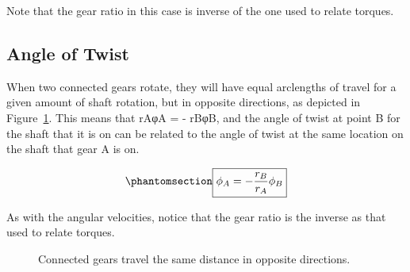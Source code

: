 \documentclass[
  letterpaper,
  DIV=11,
  numbers=noendperiod]{scrreprt}
\theoremstyle{definition}
\theoremstyle{remark}
\begin{document}
Note that the gear ratio in this case is inverse of the one used to
relate torques.

\subsection{Angle of Twist}\label{angle-of-twist}

When two connected gears rotate, they will have equal arclengths of
travel for a given amount of shaft rotation, but in opposite directions,
as depicted in Figure~\ref{fig-6.16}. This means that rAφA = - rBφB, and
the angle of twist at point B for the shaft that it is on can be related
to the angle of twist at the same location on the shaft that gear A is
on.

\begin{equation}\phantomsection\label{eq-6.7}{
\boxed{\phi_A=-\frac{r_B}{r_A} \phi_B}
}\end{equation}

As with the angular velocities, notice that the gear ratio is the
inverse as that used to relate torques.

\begin{figure}


\caption{\label{fig-6.16}Connected gears travel the same distance in
opposite directions.}

\end{figure}%
\end{document}
